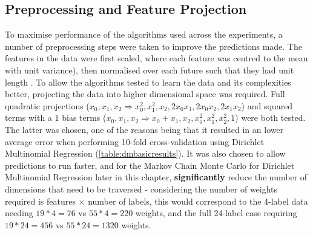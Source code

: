 \subsection{Preprocessing and Feature Projection}
To maximise performance of the algorithms used across the experiments, a number of preprocessing steps were taken to improve the predictions made. The features in the data were first scaled, where each feature was centred to the mean with unit variance), then normalised over each future such that they had unit length . To allow the algorithms tested to learn the data and its complexities better, projecting the data into higher dimensional space was required. Full quadratic projections ($x_0, x_1, x_2 \Rightarrow x_0^2 ,x_1^2 ,x_2 ,2x_0x_1 ,2x_0x_2 ,2x_1x_2$) and squared terms with a $1$ bias terms ($x_0, x_1, x_2 \Rightarrow x_0 + x_1 , x_2 ,x_0^2 ,x_1^2, x_2^2, 1$) were both tested. The latter was chosen, one of the reasons being that it resulted in an lower average error when performing 10-fold cross-validation using Dirichlet Multinomial Regression (\autoref{table:dmbasicresults}). It was also chosen to allow predictions to run faster, and for the Markov Chain Monte Carlo for Dirichlet Multinomial Regression later in this chapter, \textbf{significantly} reduce the number of dimensions that need to be traversed - considering the number of weights required is features $\times$ number of labels, this would correspond to the 4-label data needing $19*4=76$ vs $55*4=220$ weights, and the full 24-label case requiring $19*24=456$ vs $55*24=1320$ weights.



% 

